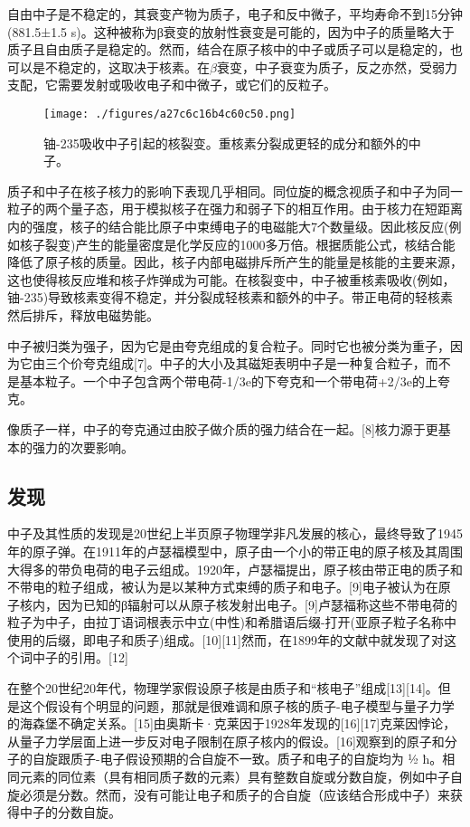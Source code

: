 自由中子是不稳定的，其衰变产物为质子，电子和反中微子，平均寿命不到15分钟(881.5±1.5 s)。这种被称为β衰变的放射性衰变是可能的，因为中子的质量略大于质子且自由质子是稳定的。然而，结合在原子核中的中子或质子可以是稳定的，也可以是不稳定的，这取决于核素。在$\beta$衰变，中子衰变为质子，反之亦然，受弱力支配，它需要发射或吸收电子和中微子，或它们的反粒子。
\begin{figure}[ht]
\centering
\texttt{[image: ./figures/a27c6c16b4c60c50.png]}
\caption{铀-235吸收中子引起的核裂变。重核素分裂成更轻的成分和额外的中子。} \label{fig_Neutro_1}
\end{figure}
质子和中子在核子核力的影响下表现几乎相同。同位旋的概念视质子和中子为同一粒子的两个量子态，用于模拟核子在强力和弱子下的相互作用。由于核力在短距离内的强度，核子的结合能比原子中束缚电子的电磁能大7个数量级。因此核反应(例如核子裂变)产生的能量密度是化学反应的1000多万倍。根据质能公式，核结合能降低了原子核的质量。因此，核子内部电磁排斥所产生的能量是核能的主要来源，这也使得核反应堆和核子炸弹成为可能。在核裂变中，中子被重核素吸收(例如，铀-235)导致核素变得不稳定，并分裂成轻核素和额外的中子。带正电荷的轻核素然后排斥，释放电磁势能。

中子被归类为强子，因为它是由夸克组成的复合粒子。同时它也被分类为重子，因为它由三个价夸克组成[7]。中子的大小及其磁矩表明中子是一种复合粒子，而不是基本粒子。一个中子包含两个带电荷-1/3e的下夸克和一个带电荷+2/3e的上夸克。

像质子一样，中子的夸克通过由胶子做介质的强力结合在一起。[8]核力源于更基本的强力的次要影响。

\subsection{发现}
中子及其性质的发现是20世纪上半页原子物理学非凡发展的核心，最终导致了1945年的原子弹。在1911年的卢瑟福模型中，原子由一个小的带正电的原子核及其周围大得多的带负电荷的电子云组成。1920年，卢瑟福提出，原子核由带正电的质子和不带电的粒子组成，被认为是以某种方式束缚的质子和电子。[9]电子被认为在原子核内，因为已知的β辐射可以从原子核发射出电子。[9]卢瑟福称这些不带电荷的粒子为中子，由拉丁语词根表示中立(中性)和希腊语后缀-打开(亚原子粒子名称中使用的后缀，即电子和质子)组成。[10][11]然而，在1899年的文献中就发现了对这个词中子的引用。[12]

在整个20世纪20年代，物理学家假设原子核是由质子和“核电子”组成[13][14]。但是这个假设有个明显的问题，那就是很难调和原子核的质子-电子模型与量子力学的海森堡不确定关系。[15]由奥斯卡·克莱因于1928年发现的[16][17]克莱因悖论，从量子力学层面上进一步反对电子限制在原子核内的假设。[16]观察到的原子和分子的自旋跟质子-电子假设预期的合自旋不一致。质子和电子的自旋均为 ½ ħ。相同元素的同位素（具有相同质子数的元素）具有整数自旋或分数自旋，例如中子自旋必须是分数。然而，没有可能让电子和质子的合自旋（应该结合形成中子）来获得中子的分数自旋。

